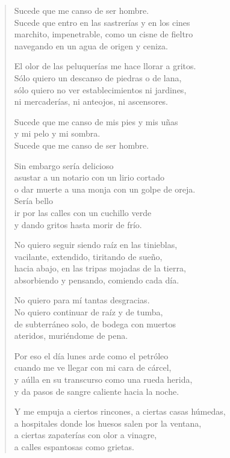 \documentclass[12pt]{article}
\begin{document}
\clearpage
{}
\begin{verse}

Sucede que me canso de ser hombre.\\
Sucede que entro en las sastrerías y en los cines\\
marchito, impenetrable, como un cisne de fieltro\\
navegando en un agua de origen y ceniza.  

El olor de las peluquerías me hace llorar a gritos.\\
Sólo quiero un descanso de piedras o de lana,\\
sólo quiero no ver establecimientos ni jardines,\\
ni mercaderías, ni anteojos, ni ascensores.  

Sucede que me canso de mis pies y mis uñas\\
y mi pelo y mi sombra.\\
Sucede que me canso de ser hombre.  

Sin embargo sería delicioso\\
asustar a un notario con un lirio cortado\\
o dar muerte a una monja con un golpe de oreja.\\
Sería bello\\
ir por las calles con un cuchillo verde\\
y dando gritos hasta morir de frío.  

No quiero seguir siendo raíz en las tinieblas,\\
vacilante, extendido, tiritando de sueño,\\
hacia abajo, en las tripas mojadas de la tierra,\\
absorbiendo y pensando, comiendo cada día.  

No quiero para mí tantas desgracias.\\
No quiero continuar de raíz y de tumba,\\
de subterráneo solo, de bodega con muertos\\
ateridos, muriéndome de pena.  

Por eso el día lunes arde como el petróleo\\
cuando me ve llegar con mi cara de cárcel,\\
y aúlla en su transcurso como una rueda herida,\\
y da pasos de sangre caliente hacia la noche.  

Y me empuja a ciertos rincones, a ciertas casas húmedas,\\
a hospitales donde los huesos salen por la ventana,\\
a ciertas zapaterías con olor a vinagre,\\
a calles espantosas como grietas.  


\end{verse}
\end{document}
